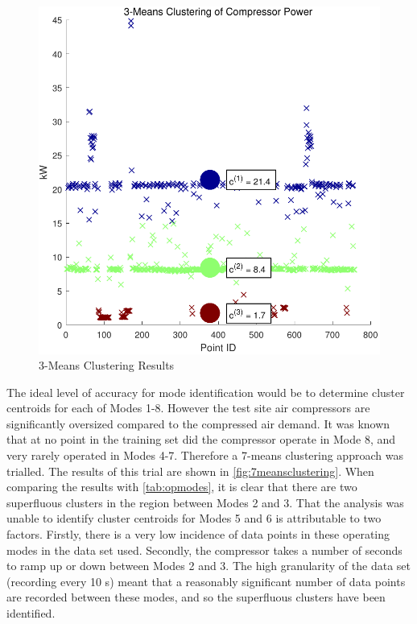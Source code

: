 \begin{figure}
\includegraphics[width = \columnwidth]{./Images/3MeansClustering.pdf}
\caption{3-Means Clustering Results}
\label{fig:3meansclustering}
\end{figure}

The ideal level of accuracy for mode identification would be to determine cluster centroids for each of Modes 1-8. However the test site air compressors are significantly oversized compared to the compressed air demand. It was known that at no point in the training set did the compressor operate in Mode 8, and very rarely operated in Modes 4-7. Therefore a 7-means clustering approach was trialled. The results of this trial are shown in \autoref{fig:7meansclustering}. When comparing the results with \autoref{tab:opmodes}, it is clear that there are two superfluous clusters in the region between Modes 2 and 3. That the analysis was unable to identify cluster centroids for Modes 5 and 6 is attributable to two factors. Firstly, there is a very low incidence of data points in these operating modes in the data set used. Secondly, the compressor takes a number of seconds to ramp up or down between Modes 2 and 3. The high granularity of the data set (recording every 10 s) meant that a reasonably significant number of data points are recorded between these modes, and so the superfluous clusters have been identified.

